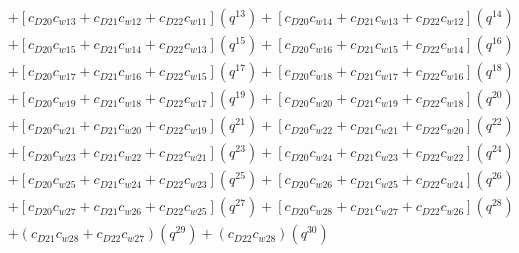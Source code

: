 \documentclass[12pt]{article}
\begin{document}
\begin{align}
    &+ [c_{D20}c_{w13} + c_{D21}c_{w12} + c_{D22}c_{w11}](q^{13}) + [c_{D20}c_{w14} + c_{D21}c_{w13} + c_{D22}c_{w12}](q^{14}) \nonumber\\
    &+ [c_{D20}c_{w15} + c_{D21}c_{w14} + c_{D22}c_{w13}](q^{15}) + [c_{D20}c_{w16} + c_{D21}c_{w15} + c_{D22}c_{w14}](q^{16}) \nonumber\\
    &+ [c_{D20}c_{w17} + c_{D21}c_{w16} + c_{D22}c_{w15}](q^{17}) + [c_{D20}c_{w18} + c_{D21}c_{w17} + c_{D22}c_{w16}](q^{18}) \nonumber\\
    &+ [c_{D20}c_{w19} + c_{D21}c_{w18} + c_{D22}c_{w17}](q^{19}) + [c_{D20}c_{w20} + c_{D21}c_{w19} + c_{D22}c_{w18}](q^{20}) \nonumber\\
    &+ [c_{D20}c_{w21} + c_{D21}c_{w20} + c_{D22}c_{w19}](q^{21}) + [c_{D20}c_{w22} + c_{D21}c_{w21} +  c_{D22}c_{w20}](q^{22}) \nonumber\\
    &+ [c_{D20}c_{w23} + c_{D21}c_{w22} + c_{D22}c_{w21}](q^{23}) + [c_{D20}c_{w24} + c_{D21}c_{w23} + c_{D22}c_{w22}](q^{24}) \nonumber\\
    &+ [c_{D20}c_{w25} + c_{D21}c_{w24} + c_{D22}c_{w23}](q^{25}) + [c_{D20}c_{w26} + c_{D21}c_{w25} + c_{D22}c_{w24}](q^{26}) \nonumber\\
    &+ [c_{D20}c_{w27} + c_{D21}c_{w26} + c_{D22}c_{w25}](q^{27}) + [c_{D20}c_{w28} + c_{D21}c_{w27} + c_{D22}c_{w26}](q^{28}) \nonumber\\
    &+ (c_{D21}c_{w28} + c_{D22}c_{w27})(q^{29}) + (c_{D22}c_{w28})(q^{30})
\end{align}
\end{document}
